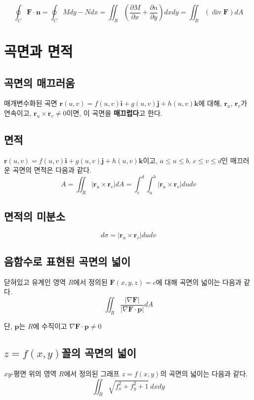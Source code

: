 \documentclass[chapter, oneside]{oblivoir}
\newcommand{\term}[1]{\textbf{#1}}
\begin{document}
$$ \oint_C \textbf{F} \cdot \textbf{n} = \oint_C M dy - N dx = \iint_R \left( \frac{\partial M}{\partial x} + \frac{\partial n}{\partial y} \right) dx dy
= \iint_R \left( \operatorname{div} \textbf{F} \right) dA  $$


\section{곡면과 면적}
\subsection{곡면의 매끄러움}
매개변수화된 곡면 $\textbf{r}(u,v) = f(u,v)\textbf{i}+g(u,v)\textbf{j}+h(u,v)\textbf{k}$에 대해, $\textbf{r}_u$, $\textbf{r}_v$가 연속이고, $\textbf{r}_u \times \textbf{r}_v \neq 0$이면, 이 곡면을 \term{매끄럽다}고 한다.

\subsection{면적}
$\textbf{r}(u,v) = f(u,v)\textbf{i}+g(u,v)\textbf{j}+h(u,v)\textbf{k}$이고, $a \le u \le b$, $c \le v \le d$인 매끄러운 곡면의 면적은 다음과 같다.
$$ A=
\iint_R \left| \textbf{r}_u \times \textbf{r}_v \right| dA
= \int_c^d\int_a^b \left| \textbf{r}_u \times \textbf{r}_v \right| dudv $$

\subsection{면적의 미분소}

$$d \sigma = \left| \textbf{r}_u \times \textbf{r}_v \right| dudv $$


\subsection{음함수로 표현된 곡면의 넓이}
닫혀있고 유계인 영역 $R$에서 정의된 $\textbf{F}(x,y,z)=c$에 대해 곡면의 넓이는 다음과 같다.
$$\iint_R \frac{\left| \nabla \textbf{F} \right|}{\left| \nabla \textbf{F} \cdot \textbf{p} \right|} dA $$

단, $\textbf{p}$는 $R$에 수직이고  $\nabla \textbf{F} \cdot \textbf{p} \ne 0$

\subsection{$z=f(x,y)$꼴의 곡면의 넓이}
$xy$-평면 위의 영역 $R$에서 정의된 그래프 $z=f(x,y)$의 곡면의 넓이는 다음과 같다.
$$ \iint_R \sqrt{f_x^2 + f_y^2 + 1} \ dx dy $$
\end{document}
